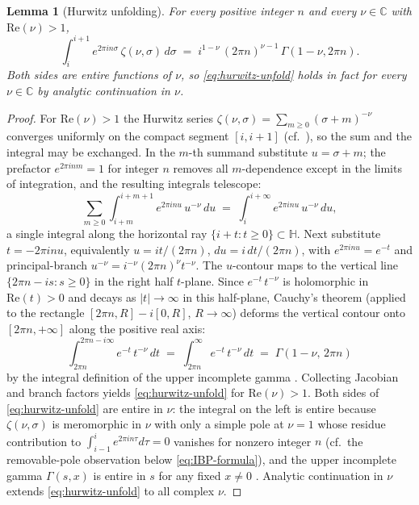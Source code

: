 \documentclass[11pt,letterpaper]{article}
\newtheorem{lemma}[theorem]{Lemma}
\newcommand{\HH}{\mathbb{H}}
\newcommand{\CC}{\mathbb{C}}
\begin{document}
\begin{lemma}[Hurwitz unfolding]\label{lem:hurwitz-unfold}
For every positive integer $n$ and every $\nu \in \CC$ with $\mathrm{Re}(\nu) > 1$,
\begin{equation}\label{eq:hurwitz-unfold}
\int_i^{i+1} e^{2\pi i n \sigma}\,\zeta(\nu, \sigma)\,d\sigma
\;=\; i^{1-\nu}\,(2\pi n)^{\nu - 1}\,\Gamma(1-\nu, 2\pi n).
\end{equation}
Both sides are entire functions of $\nu$, so \eqref{eq:hurwitz-unfold} holds in fact for every $\nu \in \CC$ by analytic continuation in $\nu$.
\end{lemma}
\begin{proof}
For $\mathrm{Re}(\nu) > 1$ the Hurwitz series $\zeta(\nu, \sigma) = \sum_{m \ge 0}(\sigma + m)^{-\nu}$ converges uniformly on the compact segment $[i, i+1]$ (cf.\ \cite[\S25.11]{DLMF}), so the sum and the integral may be exchanged.  In the $m$-th summand substitute $u = \sigma + m$; the prefactor $e^{2\pi i n m} = 1$ for integer $n$ removes all $m$-dependence except in the limits of integration, and the resulting integrals telescope:
\[
\sum_{m \ge 0} \int_{i+m}^{i+m+1} e^{2\pi i n u}\,u^{-\nu}\,du
\;=\; \int_{i}^{i + \infty} e^{2\pi i n u}\,u^{-\nu}\,du,
\]
a single integral along the horizontal ray $\{i + t : t \ge 0\} \subset \HH$.  Next substitute $t = -2\pi i n u$, equivalently $u = it/(2\pi n)$, $du = i\,dt/(2\pi n)$, with $e^{2\pi i n u} = e^{-t}$ and principal-branch $u^{-\nu} = i^{-\nu}(2\pi n)^\nu t^{-\nu}$.  The $u$-contour maps to the vertical line $\{2\pi n - is : s \ge 0\}$ in the right half $t$-plane.  Since $e^{-t}\,t^{-\nu}$ is holomorphic in $\mathrm{Re}(t) > 0$ and decays as $|t| \to \infty$ in this half-plane, Cauchy's theorem (applied to the rectangle $[2\pi n, R] - i[0, R]$, $R \to \infty$) deforms the vertical contour onto $[2\pi n, +\infty]$ along the positive real axis:
\[
\int_{2\pi n}^{2\pi n - i\infty} e^{-t}\,t^{-\nu}\,dt
\;=\; \int_{2\pi n}^{\infty} e^{-t}\,t^{-\nu}\,dt
\;=\; \Gamma(1 - \nu,\, 2\pi n)
\]
by the integral definition of the upper incomplete gamma \cite[\S8.2]{DLMF}.  Collecting Jacobian and branch factors yields \eqref{eq:hurwitz-unfold} for $\mathrm{Re}(\nu) > 1$.  Both sides of \eqref{eq:hurwitz-unfold} are entire in $\nu$: the integral on the left is entire because $\zeta(\nu, \sigma)$ is meromorphic in $\nu$ with only a simple pole at $\nu = 1$ whose residue contribution to $\int_{i-1}^i e^{2\pi i n\tau}d\tau = 0$ vanishes for nonzero integer $n$ (cf.\ the removable-pole observation below \eqref{eq:IBP-formula}), and the upper incomplete gamma $\Gamma(s, x)$ is entire in $s$ for any fixed $x \ne 0$ \cite[\S8.2.7]{DLMF}.  Analytic continuation in $\nu$ extends \eqref{eq:hurwitz-unfold} to all complex $\nu$.
\end{proof}
\end{document}
